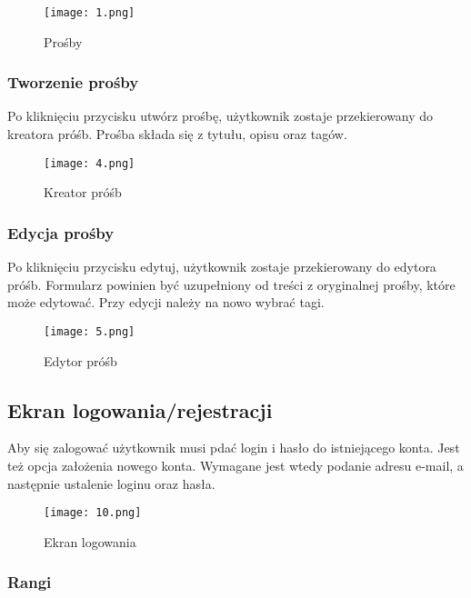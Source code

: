 \documentclass[a4paper,12pt]{article}
\begin{document}
\begin{figure}[H]
    \centering
    \texttt{[image: 1.png]}
    \caption{Prośby}
\end{figure}

\newpage

\subsubsection{Tworzenie prośby}

Po kliknięciu przycisku utwórz prośbę, użytkownik zostaje przekierowany do kreatora próśb.
Prośba składa się z tytułu, opisu oraz tagów.

\begin{figure}[H]
    \centering
    \texttt{[image: 4.png]}
    \caption{Kreator próśb}
\end{figure}

\newpage

\subsubsection{Edycja prośby}

Po kliknięciu przycisku edytuj, użytkownik zostaje przekierowany do edytora próśb.
Formularz powinien być uzupełniony od treści z oryginalnej prośby, które może edytować.
Przy edycji należy na nowo wybrać tagi.

\begin{figure}[H]
    \centering
    \texttt{[image: 5.png]}
    \caption{Edytor próśb}
\end{figure}

\newpage

\subsection{Ekran logowania/rejestracji}

Aby się zalogować użytkownik musi pdać login i hasło do istniejącego konta. Jest też opcja założenia nowego konta. Wymagane jest wtedy podanie adresu e-mail, a następnie ustalenie loginu oraz hasła.

\begin{figure}[H]
    \centering
    \texttt{[image: 10.png]}
    \caption{Ekran logowania}
\end{figure}

\newpage

\subsubsection{Rangi}
\end{document}
